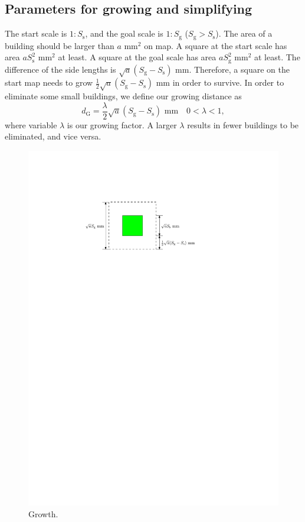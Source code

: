 \documentclass[graybox]{svmult}
\begin{document}
\subsection{Parameters for growing and simplifying}
The start scale is $1:S_\mathrm{s}$, and the goal scale is $1:S_\mathrm{g}$ 
($S_\mathrm{g}>S_\mathrm{s}$).
The area of a building should be larger than $a$ mm$^2$ on map.
A square at the start scale has area $a S_\mathrm{s}^2$ mm$^2$ at least.
A square at the goal scale has area $a S_\mathrm{g}^2$ mm$^2$ at least.
The difference of the side lengths is $\sqrt{a} (S_\mathrm{g}-S_\mathrm{s})$ 
mm.
Therefore, a square on the start map needs to grow $\frac{1}{2}\sqrt{a} 
(S_\mathrm{g}-S_\mathrm{s})$ mm in order to survive.
In order to eliminate some small buildings, we define our growing distance as
\begin{equation}
\label{eq:d_G}
	d_\mathrm{G}=\frac{\lambda}{2}\sqrt{a} (S_\mathrm{g}-S_\mathrm{s}) \text{ 
	mm} \quad 0 < \lambda <1,
\end{equation}
where variable $\lambda$ is our growing factor. A larger $\lambda$ results in  
fewer buildings to be eliminated, and vice versa.

\begin{figure}[tb]
	\centering
	\includegraphics{Growth}
	\caption{Growth.}
	\label{fig:Growth}
\end{figure}
\end{document}
